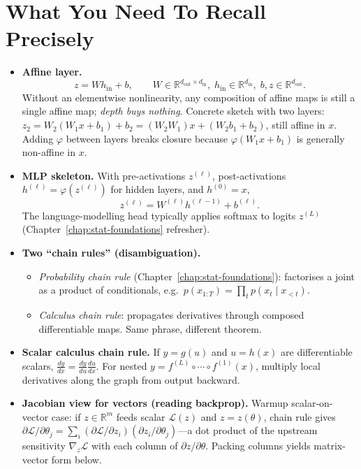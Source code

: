 \section*{What You Need To Recall Precisely}
\begin{itemize}[leftmargin=1.5em]
  \item \textbf{Affine layer.}
  \[
    z = W h_{\mathrm{in}} + b,\qquad W\in\mathbb{R}^{d_{\mathrm{out}}\times d_{\mathrm{in}}},\;
    h_{\mathrm{in}}\in\mathbb{R}^{d_{\mathrm{in}}},\; b,z\in\mathbb{R}^{d_{\mathrm{out}}}.
  \]
  Without an elementwise nonlinearity, any composition of affine maps is still a single affine map; \emph{depth buys nothing}.
  Concrete sketch with two layers: $z_2 = W_2(W_1 x + b_1)+b_2 = (W_2 W_1)x + (W_2 b_1 + b_2)$, still affine in $x$. Adding \(\varphi\) between layers breaks closure because \(\varphi(W_1 x+b_1)\) is generally non-affine in \(x\).

  \item \textbf{MLP skeleton.}
  With pre-activations \(z^{(\ell)}\), post-activations \(h^{(\ell)}=\varphi(z^{(\ell)})\) for hidden layers, and \(h^{(0)}=x\),
  \[
    z^{(\ell)} = W^{(\ell)} h^{(\ell-1)} + b^{(\ell)}.
  \]
  The language-modelling head typically applies softmax to logits \(z^{(L)}\) (Chapter~\ref{chap:stat-foundations} refresher).

  \item \textbf{Two ``chain rules'' (disambiguation).}
  \begin{itemize}[leftmargin=1.5em]
    \item \emph{Probability chain rule} (Chapter~\ref{chap:stat-foundations}): factorises a joint as a product of conditionals, e.g.\ \(p(x_{1:T})=\prod_t p(x_t\mid x_{<t})\).
    \item \emph{Calculus chain rule}: propagates derivatives through composed differentiable maps. Same phrase, different theorem.
  \end{itemize}

  \item \textbf{Scalar calculus chain rule.}
  If \(y=g(u)\) and \(u=h(x)\) are differentiable scalars, \(\displaystyle\frac{dy}{dx}=\frac{dy}{du}\frac{du}{dx}\). For nested \(y=f^{(L)}\!\circ\cdots\circ f^{(1)}(x)\), multiply local derivatives along the graph from output backward.

  \item \textbf{Jacobian view for vectors (reading backprop).}
  Warmup scalar-on-vector case: if \(z\in\mathbb{R}^m\) feeds scalar \(\mathcal{L}(z)\) and \(z=z(\theta)\), chain rule gives \(\partial \mathcal{L}/\partial \theta_j = \sum_i (\partial \mathcal{L}/\partial z_i)(\partial z_i/\partial \theta_j)\)---a dot product of the upstream sensitivity \(\nabla_z \mathcal{L}\) with each column of \(\partial z/\partial \theta\). Packing columns yields matrix-vector form below.


\end{itemize}

